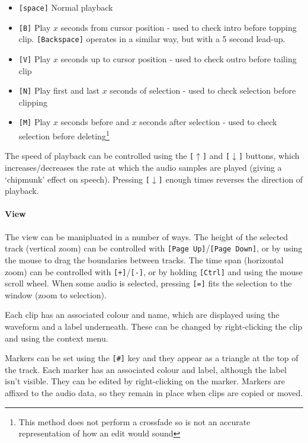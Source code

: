 \begin{itemize}
  \item \texttt{[space]} Normal playback
  \item \texttt{[B]} Play $x$ seconds from cursor position - used to check
    intro before topping clip. \texttt{[Backspace]} operates in a similar way,
    but with a 5 second lead-up.
  \item \texttt{[V]} Play $x$ seconds up to cursor position - used to check
    outro before tailing clip
  \item \texttt{[N]} Play first and last $x$ seconds of selection - used to
    check selection before clipping
  \item \texttt{[M]} Play $x$ seconds before and $x$ seconds after selection -
    used to check selection before deleting\footnote{This method does not
      perform a crossfade so is not an accurate representation of how an edit
      would sound}
\end{itemize}

The speed of playback can be controlled using the \texttt{[$\uparrow$]} and
\texttt{[$\downarrow$]} buttons, which increases/decreases the rate at which
the audio samples are played (giving a `chipmunk' effect on speech). Pressing
\texttt{[$\downarrow$]} enough times reverses the direction of playback.

\paragraph{View}
The view can be manipluated in a number of ways. The height of the selected
track (vertical zoom) can be controlled with \texttt{[Page Up]}/\texttt{[Page
  Down]}, or by using the mouse to drag the boundaries between tracks. The time
span (horizontal zoom) can be controlled with \texttt{[+]}/\texttt{[-]}, or by
holding \texttt{[Ctrl]} and using the mouse scroll wheel. When some audio is
selected, pressing \texttt{[=]} fits the selection to the window (zoom to
selection).

Each clip has an associated colour and name, which are displayed using the
waveform and a label underneath. These can be changed by right-clicking the
clip and using the context menu.

Markers can be set using the \texttt{[\#]} key and they appear as a triangle at
the top of the track. Each marker has an associated colour and label, although
the label isn't visible. They can be edited by right-clicking on the marker.
Markers are affixed to the audio data, so they remain in place when clips are
copied or moved.

